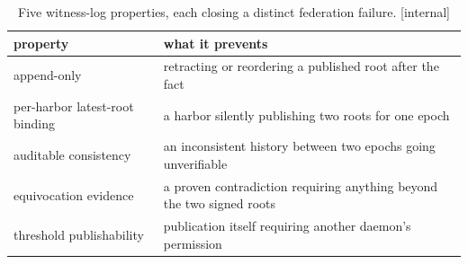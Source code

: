 %
\begin{table}[H]
\centering
\caption{Five witness-log properties, each closing a distinct federation
failure. [internal]}
\label{tab:fh-witness-log}
\small
\renewcommand{\arraystretch}{1.2}
\begin{tabularx}{\linewidth}{@{}l >{\raggedright\arraybackslash}X@{}}
\toprule
\textbf{property} & \textbf{what it prevents} \\
\midrule
append-only & retracting or reordering a published root after the fact \\
per-harbor latest-root binding & a harbor silently publishing two roots for one epoch \\
auditable consistency & an inconsistent history between two epochs going unverifiable \\
equivocation evidence & a proven contradiction requiring anything beyond the two signed roots \\
threshold publishability & publication itself requiring another daemon's permission \\
\bottomrule
\end{tabularx}
\end{table}
